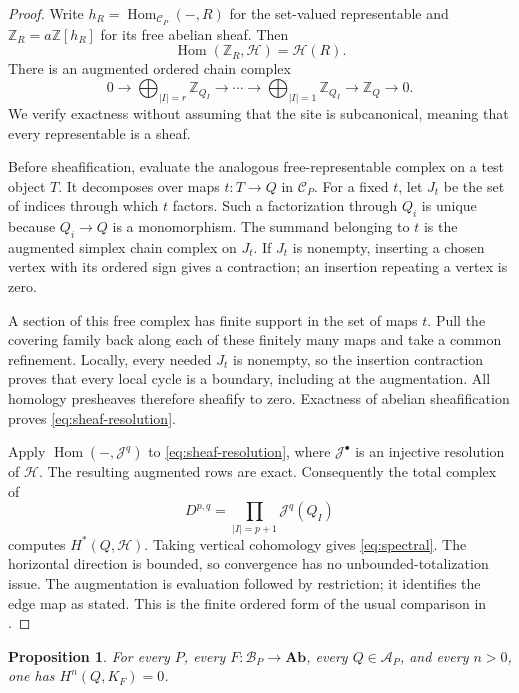 \documentclass[11pt]{article}
\newtheorem{proposition}[theorem]{Proposition}
\theoremstyle{definition}
\theoremstyle{remark}
\newcommand{\Z}{\mathbb Z}
\newcommand{\Hom}{\operatorname{Hom}}
\newcommand{\Ab}{\mathbf{Ab}}
\newcommand{\cA}{\mathcal A}
\newcommand{\cB}{\mathcal B}
\newcommand{\cC}{\mathcal C}
\begin{document}
\begin{proof}
Write $h_R=\Hom_{\cC_P}(-,R)$ for the set-valued representable and $\Z_R=a\Z[h_R]$ for its free abelian sheaf. Then
\[
 \Hom(\Z_R,\mathcal H)=\mathcal H(R).
\]
There is an augmented ordered chain complex
\begin{equation}\label{eq:sheaf-resolution}
 0\longrightarrow \bigoplus_{|I|=r}\Z_{Q_I}
 \longrightarrow\cdots\longrightarrow
 \bigoplus_{|I|=1}\Z_{Q_I}
 \longrightarrow\Z_Q\longrightarrow0.
\end{equation}
We verify exactness without assuming that the site is subcanonical, meaning that every representable is a sheaf.

Before sheafification, evaluate the analogous free-representable complex on a test object $T$. It decomposes over maps $t:T\to Q$ in $\cC_P$. For a fixed $t$, let $J_t$ be the set of indices through which $t$ factors. Such a factorization through $Q_i$ is unique because $Q_i\to Q$ is a monomorphism. The summand belonging to $t$ is the augmented simplex chain complex on $J_t$. If $J_t$ is nonempty, inserting a chosen vertex with its ordered sign gives a contraction; an insertion repeating a vertex is zero.

A section of this free complex has finite support in the set of maps $t$. Pull the covering family back along each of these finitely many maps and take a common refinement. Locally, every needed $J_t$ is nonempty, so the insertion contraction proves that every local cycle is a boundary, including at the augmentation. All homology presheaves therefore sheafify to zero. Exactness of abelian sheafification proves \eqref{eq:sheaf-resolution}.

Apply $\Hom(-,\mathcal J^q)$ to \eqref{eq:sheaf-resolution}, where $\mathcal J^\bullet$ is an injective resolution of $\mathcal H$. The resulting augmented rows are exact. Consequently the total complex of
\[
 D^{p,q}=\prod_{|I|=p+1}\mathcal J^q(Q_I)
\]
computes $H^*(Q,\mathcal H)$. Taking vertical cohomology gives \eqref{eq:spectral}. The horizontal direction is bounded, so convergence has no unbounded-totalization issue. The augmentation is evaluation followed by restriction; it identifies the edge map as stated. This is the finite ordered form of the usual comparison in \cite[Tag 03AZ]{stacks}.
\end{proof}

\begin{proposition}\label{prop:acyclic}
For every $P$, every $F:\cB_P\to\Ab$, every $Q\in\cA_P$, and every $n>0$, one has $H^n(Q,K_F)=0$.
\end{proposition}
\end{document}
